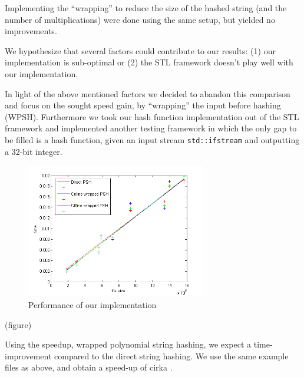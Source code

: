 \documentclass[]{article}
\newcommand{\funk}[1]{\small\texttt{#1}}
\newcommand{\cpp}{C+\!+\xspace}
\begin{document}
Implementing the ``wrapping'' to reduce the size of the hashed string (and the number of multiplications) were done using the same setup, but yielded no improvements.

We hypothesize that several factors could contribute to our results: (1) our implementation is sub-optimal or (2) the STL framework doesn't play well with our implementation.

In light of the above mentioned factors we decided to abandon this comparison and focus on the sought speed gain, by ``wrapping'' the input before hashing (WPSH). Furthermore we took our hash function implementation out of the STL framework and implemented another testing framework in which the only gap to be filled is a hash function, given an input stream \funk{std::ifstream} and outputting a 32-bit integer.







\begin{figure}[H]
	\centering
	\includegraphics[width = 0.7\textwidth]{./DirectOnlineOffline.png}
	\caption{Performance of our implementation}
	\label{fig:directpoly}
\end{figure}


(figure)

Using the speedup, wrapped polynomial string hashing, we expect a time-improvement compared to the direct string hashing. We use the same example files as above, and obtain a speed-up of cirka . %
\end{document}
